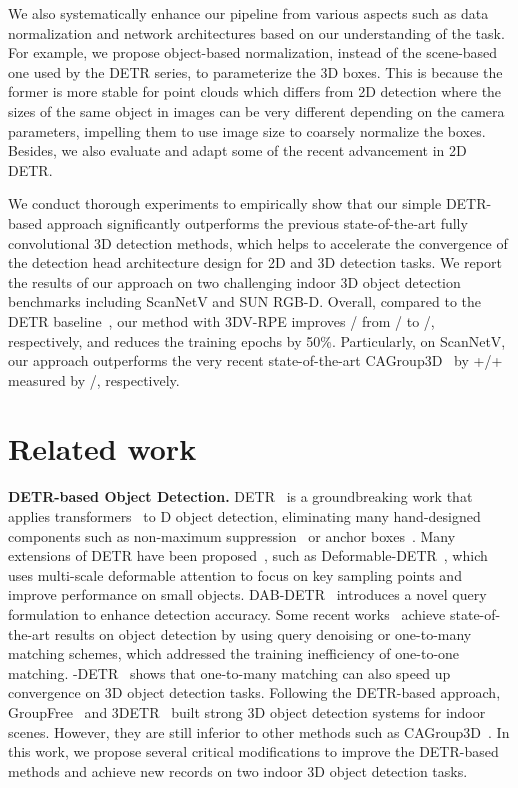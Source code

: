\documentclass[10pt,twocolumn,letterpaper]{article}
\begin{document}
We also systematically enhance our pipeline from various aspects such as data normalization and network architectures based on our understanding of the task. For example, we propose object-based normalization, instead of the scene-based one used by the DETR series, to parameterize the 3D boxes. This is because the former is more stable for point clouds which differs from 2D detection where the sizes of the same object in images can be very different depending on the camera parameters, impelling them to use image size to coarsely normalize the boxes. Besides, we also evaluate and adapt some of the recent advancement in 2D DETR.



We conduct thorough experiments to empirically show that our simple DETR-based approach significantly outperforms the previous state-of-the-art fully convolutional 3D detection methods,
which helps to accelerate the convergence of the detection head architecture design for 2D and 3D detection tasks.
We report the results of our approach on two challenging indoor 3D object detection benchmarks including ScanNetV and SUN RGB-D. Overall, compared to the DETR baseline~\cite{misra2021-3detr}, our method with 3DV-RPE improves / from / to /, respectively, and reduces the training epochs by 50\%.
Particularly, on ScanNetV, our approach outperforms the very recent state-of-the-art CAGroup3D~\cite{wang2022cagroup3d} by +/+ measured by /, respectively.


\section{Related work}

\vspace{1mm}
\noindent\textbf{DETR-based Object Detection.}
DETR~\cite{carion2020end} is a groundbreaking work that applies transformers~\cite{Vaswani2017attention} to D object detection, eliminating many hand-designed components such as non-maximum suppression~\cite{neubeck2006efficient} or anchor boxes~\cite{girshick2015fast,ren2015faster,lin2017focal,liu2016ssd}. Many extensions of DETR have been proposed~\cite{meng2021CondDETR,gao2021fast,dai2021dynamic,wang2021anchor,jia2022detrs,zhang2022dino}, such as Deformable-DETR~\cite{zhu2020deformable}, which uses multi-scale deformable attention to focus on key sampling points and improve performance on small objects. DAB-DETR~\cite{liu2022dab} introduces a novel query formulation to enhance detection accuracy. Some recent works~\cite{li2022dn,zhang2022dino,jia2022detrs,chen2022group} achieve state-of-the-art results on object detection by using query denoising or one-to-many matching schemes, which addressed the training inefficiency of one-to-one matching. -DETR~\cite{jia2022detrs} shows that one-to-many matching can also speed up convergence on 3D object detection tasks. Following the DETR-based approach, GroupFree~\cite{liu2021group} and 3DETR~\cite{misra2021-3detr} built strong 3D object detection systems for indoor scenes. However, they are still inferior to other methods such as CAGroup3D~\cite{wang2022cagroup3d}. In this work, we propose several critical modifications to improve the DETR-based methods and achieve new records on two indoor 3D object detection tasks.
\end{document}
